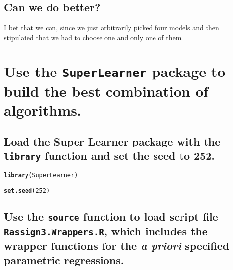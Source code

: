 \documentclass{article}\usepackage[]{graphicx}\usepackage[]{xcolor}
\makeatletter
\newcommand{\hlnum}[1]{\textcolor[rgb]{0.686,0.059,0.569}{#1}}%
\newcommand{\hlstd}[1]{\textcolor[rgb]{0.345,0.345,0.345}{#1}}%
\newcommand{\hlkwd}[1]{\textcolor[rgb]{0.737,0.353,0.396}{\textbf{#1}}}%
\newenvironment{kframe}{%
 \def\at@end@of@kframe{}%
 \ifinner\ifhmode%
  \def\at@end@of@kframe{\end{minipage}}%
  \begin{minipage}{\columnwidth}%
 \fi\fi%
 \def\FrameCommand##1{\hskip\@totalleftmargin \hskip-\fboxsep
 \colorbox{shadecolor}{##1}\hskip-\fboxsep
     \hskip-\linewidth \hskip-\@totalleftmargin \hskip\columnwidth}%
 \MakeFramed {\advance\hsize-\width
   \@totalleftmargin\z@ \linewidth\hsize
   \@setminipage}}%
 {\par\unskip\endMakeFramed%
 \at@end@of@kframe}
\newenvironment{knitrout}{}{} %
\makeatother
\begin{document}
  \subsection{Can we do better?}
  
  I bet that we can, since we just arbitrarily picked four models and then stipulated that we had to choose one and only one of them.
  
\section{Use the \texttt{SuperLearner} package to build the best combination of algorithms.}

  \subsection{Load the Super Learner package with the \texttt{library} function and set the seed to 252.}
  
\begin{knitrout}
\color{fgcolor}\begin{kframe}
\begin{alltt}
\hlkwd{library}\hlstd{(SuperLearner)}
\end{alltt}


{\ttfamily\noindent\color{warningcolor}{\#\# Warning: package 'SuperLearner' was built under R version 3.6.3}}

{\ttfamily\noindent\itshape\color{messagecolor}{\#\# Loading required package: nnls}}

{\ttfamily\noindent\itshape\color{messagecolor}{\#\# Super Learner}}

{\ttfamily\noindent\itshape\color{messagecolor}{\#\# Version: 2.0-26}}

{\ttfamily\noindent\itshape\color{messagecolor}{\#\# Package created on 2019-10-27}}\begin{alltt}
\hlkwd{set.seed}\hlstd{(}\hlnum{252}\hlstd{)}
\end{alltt}
\end{kframe}
\end{knitrout}

  \subsection{Use the \texttt{source} function to load script file \texttt{Rassign3.Wrappers.R}, which includes the wrapper functions for the \textit{a priori} specified parametric regressions.} 
  
\end{document}
